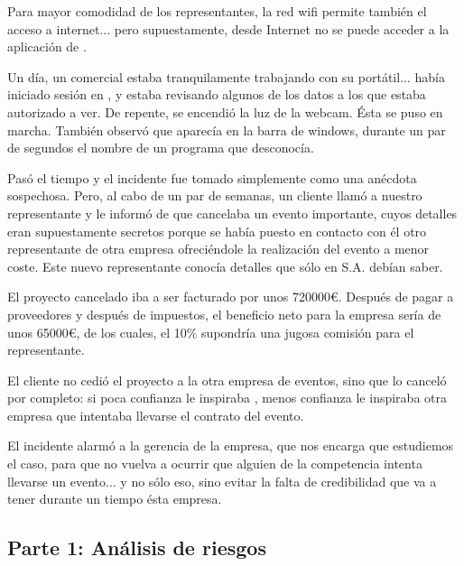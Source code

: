 Para mayor comodidad de los representantes, la red wifi permite también el acceso a internet... pero supuestamente, desde Internet no se puede acceder a la aplicación de {\nombreprogramaeventos}.

Un día, un comercial estaba tranquilamente trabajando con su portátil... había iniciado sesión en {\nombreprogramaeventos}, y estaba revisando algunos de los datos a los que estaba autorizado a ver. De repente, se encendió la luz de la webcam. Ésta se puso en marcha. También observó que aparecía en la barra de windows, durante un par de segundos el nombre de un programa que desconocía.

Pasó el tiempo y el incidente fue tomado simplemente como una anécdota sospechosa. Pero, al cabo de un par de semanas, un cliente llamó a nuestro representante y le informó de que cancelaba un evento importante, cuyos detalles eran supuestamente secretos porque se había puesto en contacto con él otro representante de otra empresa ofreciéndole la realización del evento a menor coste. Este nuevo representante conocía detalles que sólo en {\nombreempresa} S.A. debían saber.

El proyecto cancelado iba a ser facturado por unos 720000{\euro}. Después de pagar a proveedores y después de impuestos, el beneficio neto para la empresa sería de unos 65000{\euro}, de los cuales, el 10\% supondría una jugosa comisión para el representante.

El cliente no cedió el proyecto a la otra empresa de eventos, sino que lo canceló por completo: si poca confianza le inspiraba {\nombreempresa}, menos confianza le inspiraba otra empresa que intentaba llevarse el contrato del evento.

El incidente alarmó a la gerencia de la empresa, que nos encarga que estudiemos el caso, para que no vuelva a ocurrir que alguien de la competencia intenta llevarse un evento... y no sólo eso, sino evitar la falta de credibilidad que va a tener durante un tiempo ésta empresa.

\subsection{Parte 1: Análisis de riesgos}


